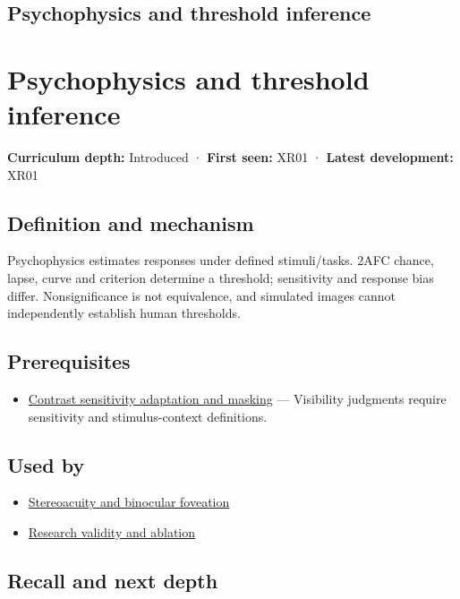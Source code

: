 \hypertarget{appendix-1759f03e8ce7}{}
\section*{Psychophysics and threshold inference}
\chapter{Psychophysics and threshold inference}\label{appendix-1759f03e8ce7-psychophysics-and-threshold-inference}

\textbf{Curriculum depth:} Introduced · \textbf{First seen:} XR01 · \textbf{Latest development:} XR01

\section{Definition and mechanism}\label{appendix-1759f03e8ce7-definition-and-mechanism}

Psychophysics estimates responses under defined stimuli/tasks. 2AFC chance, lapse, curve and criterion determine a threshold; sensitivity and response bias differ. Nonsignificance is not equivalence, and simulated images cannot independently establish human thresholds.

\section{Prerequisites}\label{appendix-1759f03e8ce7-prerequisites}

\begin{itemize}
\tightlist
\item
  \hyperref[appendix-b3aa9e8e01ad]{Contrast sensitivity adaptation and masking} --- Visibility judgments require sensitivity and stimulus-context definitions.
\end{itemize}

\section{Used by}\label{appendix-1759f03e8ce7-used-by}

\begin{itemize}
\tightlist
\item
  \hyperref[appendix-8dc848f14052]{Stereoacuity and binocular foveation}
\item
  \hyperref[appendix-65788587ef78]{Research validity and ablation}
\end{itemize}

\section{Recall and next depth}\label{appendix-1759f03e8ce7-recall-and-next-depth}

